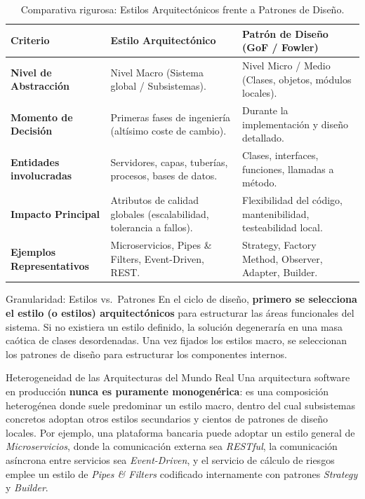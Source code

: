 \begin{table}[htbp]
\centering
\small
\begin{tabularx}{\textwidth}{l p{5.5cm} p{6.5cm}}
\toprule
\textbf{Criterio} & \textbf{Estilo Arquitectónico} & \textbf{Patrón de Diseño (GoF / Fowler)} \\
\midrule
\textbf{Nivel de Abstracción} & Nivel Macro (Sistema global / Subsistemas). & Nivel Micro / Medio (Clases, objetos, módulos locales). \\
\addlinespace
\textbf{Momento de Decisión} & Primeras fases de ingeniería (altísimo coste de cambio). & Durante la implementación y diseño detallado. \\
\addlinespace
\textbf{Entidades involucradas} & Servidores, capas, tuberías, procesos, bases de datos. & Clases, interfaces, funciones, llamadas a método. \\
\addlinespace
\textbf{Impacto Principal} & Atributos de calidad globales (escalabilidad, tolerancia a fallos). & Flexibilidad del código, mantenibilidad, testeabilidad local. \\
\addlinespace
\textbf{Ejemplos Representativos} & Microservicios, Pipes \& Filters, Event-Driven, REST. & Strategy, Factory Method, Observer, Adapter, Builder. \\
\bottomrule
\end{tabularx}
\caption{Comparativa rigurosa: Estilos Arquitectónicos frente a Patrones de Diseño.}
\label{tab:estilos-vs-patrones}
\end{table}

\begin{tradeoff}{Granularidad: Estilos vs.\ Patrones}
En el ciclo de diseño, \textbf{primero se selecciona el estilo (o estilos) arquitectónicos} para estructurar las áreas funcionales del sistema. Si no existiera un estilo definido, la solución degeneraría en una masa caótica de clases desordenadas. Una vez fijados los estilos macro, se seleccionan los patrones de diseño para estructurar los componentes internos.
\end{tradeoff}

\begin{importante}{Heterogeneidad de las Arquitecturas del Mundo Real}
Una arquitectura software en producción \textbf{nunca es puramente monogenérica}: es una composición heterogénea donde suele predominar un estilo macro, dentro del cual subsistemas concretos adoptan otros estilos secundarios y cientos de patrones de diseño locales. Por ejemplo, una plataforma bancaria puede adoptar un estilo general de \emph{Microservicios}, donde la comunicación externa sea \emph{RESTful}, la comunicación asíncrona entre servicios sea \emph{Event-Driven}, y el servicio de cálculo de riesgos emplee un estilo de \emph{Pipes \& Filters} codificado internamente con patrones \emph{Strategy} y \emph{Builder}.
\end{importante}

